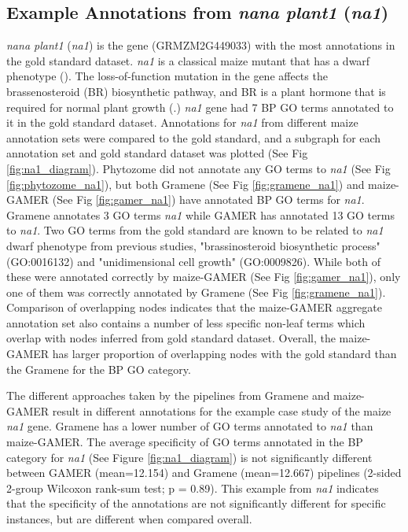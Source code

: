 \subsection{Example Annotations from \emph{nana plant1} (\emph{na1})}
\emph{nana plant1} (\emph{na1}) is the gene (GRMZM2G449033) with the most annotations in the gold standard dataset. \emph{na1} is a classical maize mutant that has a dwarf phenotype (\cite{hartwig_2011-1P}). The loss-of-function mutation in the gene affects the brassenosteroid (BR) biosynthetic pathway, and BR is a plant hormone that is required for normal plant growth (\cite{hartwig_2011-1P}.)  \emph{na1} gene had 7 BP GO terms annotated to it in the gold standard dataset. Annotations for \emph{na1} from different maize annotation sets were compared to the gold standard, and a subgraph for each annotation set and gold standard dataset was plotted (See Fig \ref{fig:na1_diagram}). Phytozome did not annotate any GO terms to \emph{na1} (See Fig \ref{fig:phytozome_na1}), but both Gramene (See Fig \ref{fig:gramene_na1}) and maize-GAMER (See Fig \ref{fig:gamer_na1}) have annotated BP GO terms for \emph{na1}. Gramene annotates 3 GO terms \emph{na1} while GAMER has annotated 13 GO terms to \emph{na1}. Two GO terms from the gold standard are known to be related to \emph{na1} dwarf phenotype from previous studies, "brassinosteroid biosynthetic process" (GO:0016132) and "unidimensional cell growth" (GO:0009826). While both of these were annotated correctly by maize-GAMER (See Fig \ref{fig:gamer_na1}), only one of them was correctly annotated by Gramene (See Fig \ref{fig:gramene_na1}). Comparison of overlapping nodes indicates that the maize-GAMER aggregate annotation set also contains a number of less specific non-leaf terms which overlap with nodes inferred from gold standard dataset. Overall, the maize-GAMER has larger proportion of overlapping nodes with the gold standard than the Gramene for the BP GO category.

The different approaches taken by the pipelines from Gramene and maize-GAMER result in different annotations for the example case study of the maize \emph{na1} gene. Gramene has a lower number of GO terms annotated to \emph{na1} than maize-GAMER. The average specificity of GO terms annotated in the BP category for \emph{na1} (See Figure \ref{fig:na1_diagram}) is not significantly different between GAMER (mean=12.154) and Gramene (mean=12.667) pipelines (2-sided 2-group Wilcoxon rank-sum test; p = 0.89). This example from \emph{na1} indicates that the specificity of the annotations are not significantly different for specific instances, but are different when compared overall.